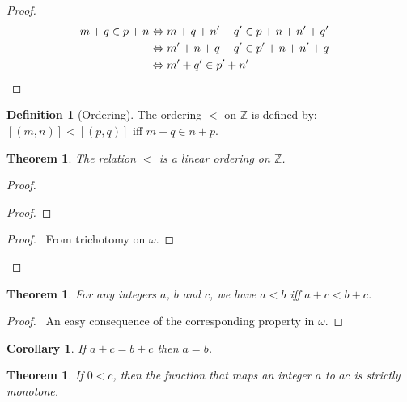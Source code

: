 \documentclass{article}
\let\qed\relax
\newtheorem{theorem}[axiom]{Theorem}
\newtheorem{corollary}{Corollary}[axiom]
\theoremstyle{definition}
\newtheorem{definition}[axiom]{Definition}
\begin{document}
    \begin{proof}
        \pf
        \begin{align*}
            m + q \in p + n & \Leftrightarrow m + q + n' + q' \in p + n + n' + q' \\
            & \Leftrightarrow m' + n + q + q' \in p' + n + n' + q \\
            & \Leftrightarrow m' + q' \in p' + n' & \qed
        \end{align*}
    \end{proof}

    \begin{definition}[Ordering]
        The ordering $<$ on $\mathbb{Z}$ is defined by: $[(m,n)] < [(p,q)]$ iff $m + q \in n + p$.
    \end{definition}

    \begin{theorem}
        The relation $<$ is a linear ordering on $\mathbb{Z}$.
    \end{theorem}

    \begin{proof}
        \pf
        \begin{proof}
        \end{proof}
        \begin{proof}
            \pf\ From trichotomy on $\omega$.
        \end{proof}
        \qed
    \end{proof}

    \begin{theorem}
        For any integers $a$, $b$ and $c$, we have $a < b$ iff $a + c < b + c$.
    \end{theorem}

    \begin{proof}
        \pf\ An easy consequence of the corresponding property in $\omega$.
    \end{proof}

    \begin{corollary}
        If $a + c = b + c$ then $a = b$.
    \end{corollary}

    \begin{theorem}
        If $0 < c$, then the function that maps an integer $a$ to $ac$ is strictly monotone.
    \end{theorem}
\end{document}
